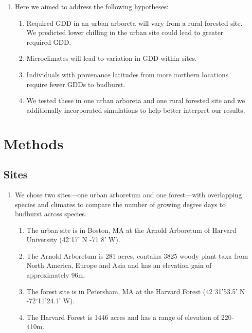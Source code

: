 \documentclass{article}\usepackage[]{graphicx}\usepackage[]{color}
\begin{document}
\begin{enumerate}
\item Here we aimed to address the following hypotheses:
  \begin{enumerate} 
  \item Required GDD in an urban arboreta will vary from a rural forested site. We predicted lower chilling in the urban site could lead to greater required GDD.
  \item Microclimates will lead to variation in GDD within sites. 
  \item Individuals with provenance latitudes from more northern locations require fewer GDDs to budburst. 
  \item We tested these in one urban arboreta and one rural forested site and we additionally incorporated simulations to help better interpret our results. 
  \end{enumerate}
\end{enumerate}

\section*{Methods}
\subsection*{Sites}
\begin{enumerate}
\item We chose two sites---one urban arboretum and one forest---with overlapping species and climates to compare the number of growing degree days to budburst across species. 
  \begin{enumerate}
  \item The urban site is in Boston, MA at the Arnold Arboretum of Harvard University (42$^{\circ}$17' N -71$^{\circ}$8' W).
  \item The Arnold Arboretum is 281 acres, contains 3825 woody plant taxa from North America, Europe and Asia and has an elevation gain of approximately 96m.
  \item The forest site is in Petersham, MA at the Harvard Forest (42$^{\circ}$31'53.5' N -72$^{\circ}$11'24.1' W).
  \item The Harvard Forest is 1446 acres and has a range of elevation of 220-410m. 
  \end{enumerate}
\end{enumerate}
  
\end{document}
